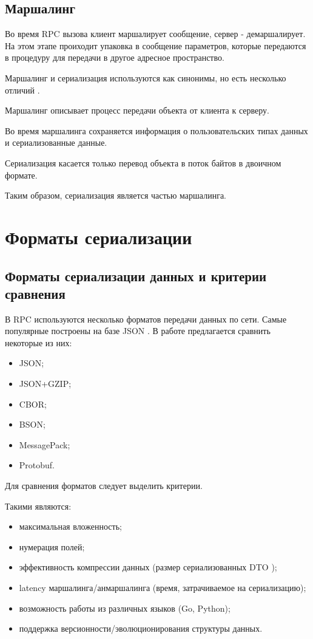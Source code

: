 \clearpage
\section{Маршалинг}

Во время RPC вызова клиент маршалирует сообщение, сервер - демаршалирует.
На этом этапе проиходит упаковка в сообщение параметров, которые передаются в процедуру для передачи в другое адресное пространство.

Маршалинг и сериализация используются как синонимы, но есть несколько отличий \cite{marshal-vs-serialize}.

Маршалинг описывает процесс передачи объекта от клиента к серверу. 

Во время маршалинга сохраняется информация о пользовательских типах данных и сериализованные данные.

Сериализация касается только перевод объекта в поток байтов в двоичном формате.

Таким образом, сериализация является частью маршалинга.

\chapter{Форматы сериализации}

\section{Форматы сериализации данных и критерии сравнения}

В RPC используются несколько форматов передачи данных по сети.
Самые популярные построены на базе JSON \cite{json-info}.
В работе предлагается сравнить некоторые из них:
\begin{itemize}
\item JSON;
\item JSON+GZIP;
\item CBOR;
\item BSON;
\item MessagePack;
\item Protobuf.
\end{itemize}
\newpage
Для сравнения форматов следует выделить критерии.

Такими являются:
\begin{itemize}
\item максимальная вложенность;
\item нумерация полей;
\item эффективность компрессии данных (размер сериализованных DTO \cite{dto-info});
\item latency маршалинга/анмаршалинга (время, затрачиваемое на сериализацию);
\item возможность работы из различных языков (Go, Python);
\item поддержка версионности/эволюционирования структуры данных.
\end{itemize}

